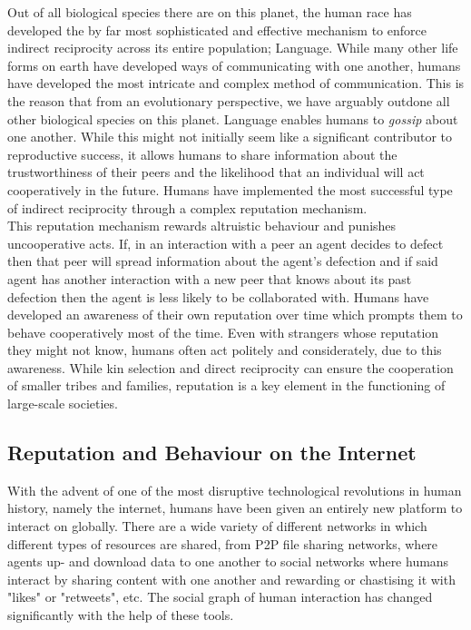 \documentclass[11pt,a4paper]{article}
\theoremstyle{definition}
\theoremstyle{theorem}
\theoremstyle{proposition}
\theoremstyle{corollary}
\theoremstyle{lemma}
\theoremstyle{example}
\theoremstyle{remark}
\begin{document}
\noindent{}Out of all biological species there are on this planet, the human race has developed the by far most sophisticated and effective mechanism to enforce indirect reciprocity across its entire population; Language. While many other life forms on earth have developed ways of communicating with one another, humans have developed the most intricate and complex method of communication. This is the reason that from an evolutionary perspective, we have arguably outdone all other biological species on this planet. Language enables humans to {\it gossip} about one another. While this might not initially seem like a significant contributor to reproductive success, it allows humans to share information about the trustworthiness of their peers and the likelihood that an individual will act cooperatively in the future. Humans have implemented the most successful type of indirect reciprocity through a complex reputation mechanism. \vspace{1em}\\

\noindent{}This reputation mechanism rewards altruistic behaviour and punishes uncooperative acts. If, in an interaction with a peer an agent decides to defect then that peer will spread information about the agent's defection and if said agent has another interaction with a new peer that knows about its past defection then the agent is less likely to be collaborated with. Humans have developed an awareness of their own reputation over time which prompts them to behave cooperatively most of the time. Even with strangers whose reputation they might not know, humans often act politely and considerately, due to this awareness. While kin selection and direct reciprocity can ensure the cooperation of smaller tribes and families, reputation is a key element in the functioning of large-scale societies. \vspace{1em}\\

\subsection{Reputation and Behaviour on the Internet}
\label{subsec:Reputation and Behaviour on the Internet}
\noindent{}With the advent of one of the most disruptive technological revolutions in human history, namely the internet, humans have been given an entirely new platform to interact on globally. There are a wide variety of different networks in which different types of resources are shared, from P2P file sharing networks, where agents up- and download data to one another to social networks where humans interact by sharing content with one another and rewarding or chastising it with "likes" or "retweets", etc. The social graph of human interaction has changed significantly with the help of these tools.\vspace{1em}\\
\end{document}

